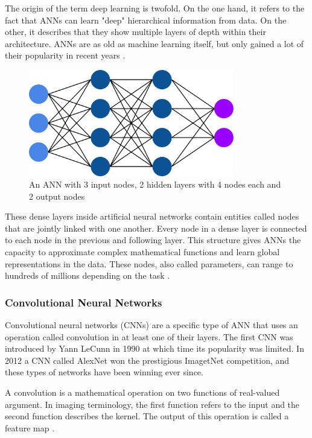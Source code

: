 The origin of the term deep learning is twofold. On the one hand, it refers to the fact that ANNs can learn "deep" hierarchical information from data. On the other, it describes that they show multiple layers of depth within their architecture. ANNs are as old as machine learning itself, but only gained a lot of their popularity in recent years \cite{Chollet2017}.

\begin{figure}[H]
\centering
\par
\includegraphics[width=0.8\textwidth]{imgs/ann.png}
\caption{An ANN with 3 input nodes, 2 hidden layers with 4 nodes each and 2 output nodes}
\par
\end{figure}

These dense layers inside artificial neural networks contain entities called nodes that are jointly linked with one another. Every node in a dense layer is connected to each node in the previous and following layer. This structure gives ANNs the capacity to approximate complex mathematical functions and learn global representations in the data. These nodes, also called parameters, can range to hundreds of millions depending on the task \cite{Simonyan2014a}.

\subsubsection{Convolutional Neural Networks}

Convolutional neural networks (CNNs) are a specific type of ANN that uses an operation called convolution in at least one of their layers. The first CNN was introduced by Yann LeCunn \cite{LeCun1990} in 1990 at which time its popularity was limited. In 2012 a CNN called AlexNet \cite{Krizhevsky} won the prestigious ImagetNet competition, and these types of networks have been winning ever since.

A convolution is a mathematical operation on two functions of real-valued argument. In imaging terminology, the first function refers to the input and the second function describes the kernel. The output of this operation is called a feature map \cite{Goodfellow2016}.

